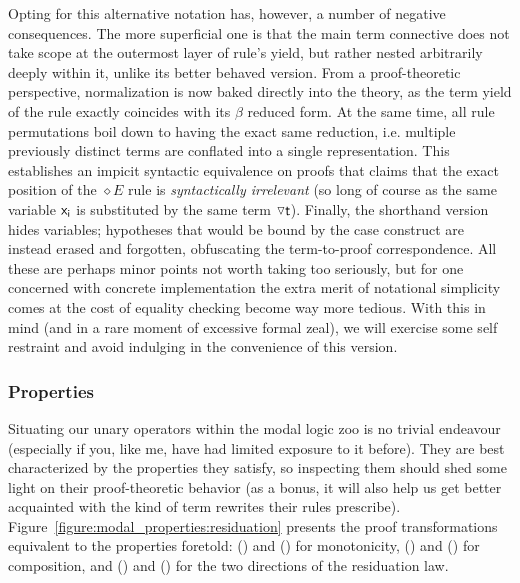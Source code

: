 Opting for this alternative notation has, however, a number of negative consequences.
The more superficial one is that the main term connective does not take scope at the outermost layer of rule's yield, but rather nested arbitrarily deeply within it, unlike its better behaved version.
From a proof-theoretic perspective, normalization is now baked directly into the theory, as the term yield of the rule exactly coincides with its $\beta$ reduced form.
At the same time, all rule permutations boil down to having the exact same reduction, i.e. multiple previously distinct terms are conflated into a single representation.
This establishes an impicit syntactic equivalence on proofs that claims that the exact position of the $\diamond E$ rule is \textit{syntactically irrelevant} (so long of course as the same variable $\mathsf{x_i }$ is substituted by the same term $\smallterm{\diaelim t}$).
Finally, the shorthand version hides variables; hypotheses that would be bound by the case construct are instead erased and forgotten, obfuscating the term-to-proof correspondence.
All these are perhaps minor points not worth taking too seriously, but for one concerned with concrete implementation the extra merit of notational simplicity comes at the cost of equality checking become way more tedious.
With this in mind (and in a rare moment of excessive formal zeal), we will exercise some self restraint and avoid indulging in the convenience of this version.

\subsubsection{Properties}
Situating our unary operators within the modal logic zoo is no trivial endeavour (especially if you, like me, have had limited exposure to it before).
They are best characterized by the properties they satisfy, so inspecting them should shed some light on their proof-theoretic behavior (as a bonus, it will also help us get better acquainted with the kind of term rewrites their rules prescribe).
Figure~\ref{figure:modal_properties:residuation} presents the proof transformations equivalent to the properties foretold:
 () and () for monotonicity, () and () for composition, and () and () for the two directions of the residuation law.
 
